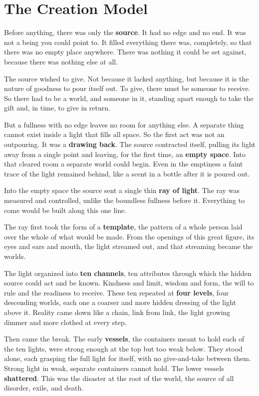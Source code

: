 \section{The Creation Model}

Before anything, there was only the \textbf{source}. It had no edge and no end. It
was not a being you could point to. It filled everything there was, completely, so
that there was no empty place anywhere. There was nothing it could be set against,
because there was nothing else at all.

The source wished to give. Not because it lacked anything, but because it is the
nature of goodness to pour itself out. To give, there must be someone to receive.
So there had to be a world, and someone in it, standing apart enough to take the
gift and, in time, to give in return.

But a fullness with no edge leaves no room for anything else. A separate thing
cannot exist inside a light that fills all space. So the first act was not an
outpouring. It was a \textbf{drawing back}. The source contracted itself, pulling
its light away from a single point and leaving, for the first time, an \textbf{empty
space}. Into that cleared room a separate world could begin. Even in the emptiness
a faint trace of the light remained behind, like a scent in a bottle after it is
poured out.

Into the empty space the source sent a single thin \textbf{ray of light}. The ray
was measured and controlled, unlike the boundless fullness before it. Everything to
come would be built along this one line.

The ray first took the form of a \textbf{template}, the pattern of a whole person
laid over the whole of what would be made. From the openings of this great figure,
its eyes and ears and mouth, the light streamed out, and that streaming became the
worlds.

The light organized into \textbf{ten channels}, ten attributes through which the
hidden source could act and be known. Kindness and limit, wisdom and form, the
will to rule and the readiness to receive. These ten repeated at \textbf{four
levels}, four descending worlds, each one a coarser and more hidden dressing of the
light above it. Reality came down like a chain, link from link, the light growing
dimmer and more clothed at every step.

Then came the break. The early \textbf{vessels}, the containers meant to hold each
of the ten lights, were strong enough at the top but too weak below. They stood
alone, each grasping the full light for itself, with no give-and-take between them.
Strong light in weak, separate containers cannot hold. The lower vessels
\textbf{shattered}. This was the disaster at the root of the world, the source of
all disorder, exile, and death.

